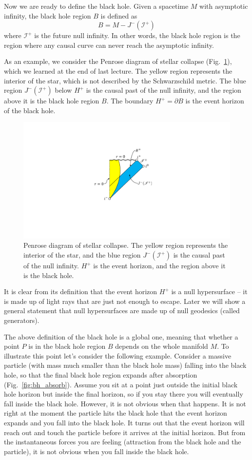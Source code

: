 \documentclass[11pt,table]{article}
\begin{document}
Now we are ready to define the black hole. Given a spacetime $M$ with asymptotic infinity, the black hole region $B$ is defined as
\begin{equation}
B = M - J^-(\mathscr{I}^+)
\end{equation}
where $\mathscr{I}^+$ is the future null infinity. In other words, the black hole region is the region where any causal curve can never reach the asymptotic infinity.

As an example, we consider the Penrose diagram of stellar collapse (Fig.~\ref{fig:stellar_collapse}), which we learned at the end of last lecture. The yellow region represents the interior of the star, which is not described by the Schwarzschild metric. The blue region $J^-(\mathscr{I}^+)$ below $H^+$ is the causal past of the null infinity, and the region above it is the black hole region $B$. The boundary $H^+=\partial B$ is the event horizon of the black hole.

\begin{figure}[H]
\centering
\includegraphics[width=0.5\linewidth]{stellar_collapse.pdf}
\caption{Penrose diagram of stellar collapse. The yellow region represents the interior of the star, and the blue region $J^-(\mathscr{I}^+)$ is the causal past of the null infinity. $H^+$ is the event horizon, and the region above it is the black hole.} \label{fig:stellar_collapse}
\end{figure}

It is clear from its definition that the event horizon $H^+$ is a null hypersurface -- it is made up of light rays that are just not enough to escape. Later we will show a general statement that null hypersurfaces are made up of null geodesics (called generators).

The above definition of the black hole is a global one, meaning that whether a point $P$ is in the black hole region $B$ depends on the whole manifold $M$. To illustrate this point let's consider the following example. Consider a massive particle (with mass much smaller than the black hole mass) falling into the black hole, so that the final black hole region expands after absorption (Fig.~\ref{fig:bh_absorb}). Assume you sit at a point just outside the initial black hole horizon but inside the final horizon, so if you stay there you will eventually fall inside the black hole. However, it is not obvious when that happens. It is not right at the moment the particle hits the black hole that the event horizon expands and you fall into the black hole. It turns out that the event horizon will reach out and touch the particle before it arrives at the initial horizon. But from the instantaneous forces you are feeling (attraction from the black hole and the particle), it is not obvious when you fall inside the black hole.
\end{document}
